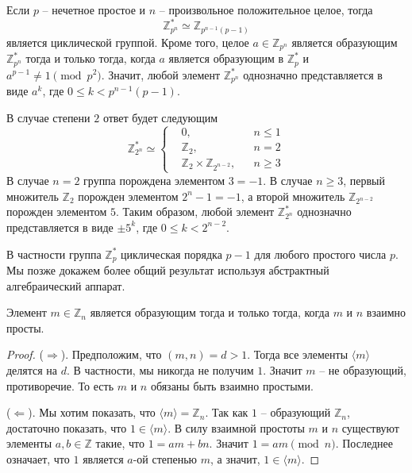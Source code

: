 \begin{claim}
Если $p$ -- нечетное простое и $n$ -- произвольное положительное целое, тогда
\[
\mathbb Z_{p^n}^* \simeq \mathbb Z_{p^{n-1}(p-1)}
\]
является циклической группой.
Кроме того, целое $a\in \mathbb Z_{p^n}$ является образующим $\mathbb Z_{p^n}^* $ тогда и только тогда, когда $a$ является образующим в $\mathbb Z_p^*$ и $a^{p-1}\neq 1 \pmod{ p^2}$.
Значит, любой элемент $\mathbb Z_{p^n}^*$ однозначно представляется в виде $a^k$, где $0\leqslant k < p^{n-1}(p-1)$.

В случае степени $2$ ответ будет следующим
\[
\mathbb Z_{2^n}^*\simeq
\left\{
\begin{aligned}
&0, & &n\leqslant 1\\
&\mathbb Z_2, & &n = 2\\
&\mathbb Z_2\times \mathbb Z_{2^{n-2}}, & &n\geqslant 3
\end{aligned}
\right.
\]
В случае $n = 2$ группа порождена элементом $3 = -1$.
В случае $n \geqslant 3$, первый множитель $\mathbb Z_2$ порожден элементом $2^n - 1 = -1$, а второй множитель $\mathbb Z_{2^{n-2}}$ порожден элементом $5$.
Таким образом, любой элемент $\mathbb Z_{2^n}^*$ однозначно представляется в виде $\pm 5^k$, где $0\leqslant k < 2^{n-2}$.
\end{claim}

В частности группа $\mathbb Z_p^*$ циклическая порядка $p-1$ для любого простого числа $p$.
Мы позже докажем более общий результат используя абстрактный алгебраический аппарат.

\begin{claim}
Элемент $m\in \mathbb Z_n$ является образующим тогда и только тогда, когда $m$ и $n$ взаимно просты.
\end{claim}
\begin{proof}
($\Rightarrow$).
Предположим, что $(m, n) = d > 1$.
Тогда все элементы $\langle m\rangle$ делятся на $d$.
В частности, мы никогда не получим $1$.
Значит $m$ -- не образующий, противоречие.
То есть $m$ и $n$ обязаны быть взаимно простыми.

($\Leftarrow$).
Мы хотим показать, что $\langle m\rangle = \mathbb Z_n$.
Так как $1$ -- образующий $\mathbb Z_n$, достаточно показать, что $1\in \langle m\rangle$.
В силу взаимной простоты $m$ и $n$ существуют элементы  $a, b\in \mathbb Z$ такие, что $1 = a m + b n$.
Значит $1 = a m \pmod n$.
Последнее означает, что $1$ является $a$-ой степенью $m$, а значит, $1 \in \langle m \rangle$.
\end{proof}


